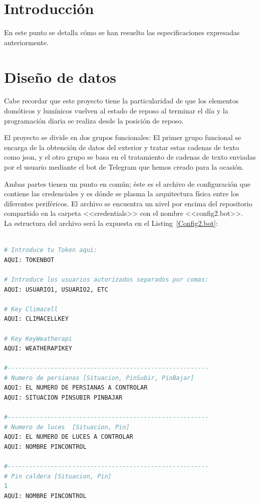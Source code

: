 \section{Introducción}
En este punto se detalla cómo se han resuelto las especificaciones expresadas anteriormente.
\section{Diseño de datos}

Cabe recordar que este proyecto tiene la particularidad de que los elementos domóticos y lumínicos vuelven al estado de reposo al terminar el día y la programación diaria se realiza desde la posición de reposo.

El proyecto se divide en dos grupos funcionales: 
El primer grupo funcional se encarga de la obtención de datos del exterior y tratar estas cadenas de texto como json, y el otro grupo se basa en el tratamiento de cadenas de texto enviadas por el usuario mediante el bot de Telegram que hemos creado para la ocasión.

Ambas partes tienen un punto en común; éste es el archivo de configuración que contiene las credenciales y es dónde se plasma la arquitectura física entre los diferentes periféricos. El archivo se encuentra un nivel por encima del repositorio compartido en la carpeta <<credentials>> con el nombre <<config2.bot>>.~\\

La estructura del archivo será la expuesta en el Listing~\ref{Config2.bot}:~\\~\\
\begin{lstlisting}[language=Python, caption={Estructura del archivo de configuración general de la \mbox{arquitectura}.\\}, basicstyle=\small, label={Config2.bot}]
# Introduce tu Token aqui:
AQUI: TOKENBOT

# Introduce los usuarios autorizados separados por comas:
AQUI: USUARIO1, USUARIO2, ETC

# Key Climacell
AQUI: CLIMACELLKEY

# Key KeyWeatherapi
AQUI: WEATHERAPIKEY

#--------------------------------------------------------
# Numero de persianas [Situacion, PinSubir, PinBajar]
AQUI: EL NUMERO DE PERSIANAS A CONTROLAR
AQUI: SITUACION PINSUBIR PINBAJAR

#--------------------------------------------------------
# Numero de luces  [Situacion, Pin]
AQUI: EL NUMERO DE LUCES A CONTROLAR
AQUI: NOMBRE PINCONTROL

#--------------------------------------------------------
# Pin caldera [Situacion, Pin]
1
AQUI: NOMBRE PINCONTROL
\end{lstlisting}


